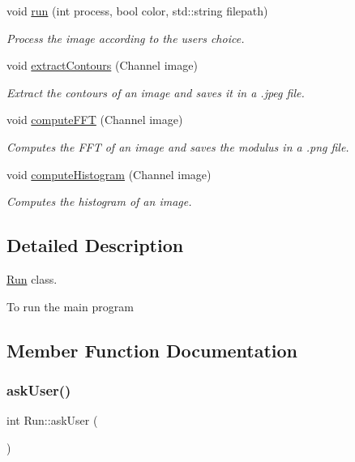 \begin{DoxyCompactItemize}
void \hyperlink{class_run_a791a26dc9f036082e1fae6dbce7d8944}{run} (int process, bool color, std\+::string filepath)
\begin{DoxyCompactList}\small\item\em Process the image according to the user\textquotesingle{}s choice. \end{DoxyCompactList}\item 
void \hyperlink{class_run_afa7093c55a83956621e6b865f7b7d427}{extract\+Contours} (Channel image)
\begin{DoxyCompactList}\small\item\em Extract the contours of an image and saves it in a .jpeg file. \end{DoxyCompactList}\item 
void \hyperlink{class_run_a32a683ef3c55139cc3f62ceab409d2eb}{compute\+F\+FT} (Channel image)
\begin{DoxyCompactList}\small\item\em Computes the F\+FT of an image and saves the modulus in a .png file. \end{DoxyCompactList}\item 
void \hyperlink{class_run_a2442d8d1adf860040ddbdbe0280c3a37}{compute\+Histogram} (Channel image)
\begin{DoxyCompactList}\small\item\em Computes the histogram of an image. \end{DoxyCompactList}\end{DoxyCompactItemize}


\subsection{Detailed Description}
\hyperlink{class_run}{Run} class. 

To run the main program 

\subsection{Member Function Documentation}
\mbox{\label{class_run_a5493b768fdf04b773ab5a2ddcec8d805}} 
\subsubsection{\texorpdfstring{ask\+User()}{askUser()}}
{\footnotesize\ttfamily int Run\+::ask\+User (\begin{DoxyParamCaption}{ }\end{DoxyParamCaption})}



